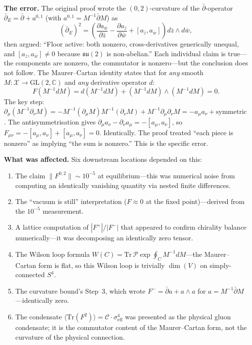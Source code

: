 \documentclass[11pt,a4paper]{article}
\theoremstyle{definition}
\theoremstyle{remark}
\newcommand{\C}{\mathbb{C}}
\newcommand{\dbar}{\bar{\partial}}
\newcommand{\Tr}{\mathrm{Tr}}
\newcommand{\GL}{\mathrm{GL}}
\newcommand{\su}{\mathfrak{su}}
\begin{document}
\textbf{The error.} The original proof wrote the $(0,2)$-curvature of the $\dbar$-operator $\dbar_E=\dbar+a^{0,1}$ (with $a^{0,1}=M^{-1}\dbar M$) as
\[
(\dbar_E)^2=\left(\frac{\partial a_{\bar{w}}}{\partial\bar{z}}-\frac{\partial a_{\bar{z}}}{\partial\bar{w}}+[a_{\bar{z}},a_{\bar{w}}]\right)d\bar{z}\wedge d\bar{w},
\]
then argued: ``Floor active: both nonzero, cross-derivatives generically unequal, and $[a_{\bar z},a_{\bar w}]\neq 0$ because $\su(2)$ is non-abelian.'' Each individual claim is true---the components are nonzero, the commutator is nonzero---but the conclusion does not follow. The Maurer--Cartan identity states that for \emph{any} smooth $M:\mathcal{X}\to\GL(2,\C)$ and \emph{any} derivative operator $d$:
\[
F(M^{-1}dM)=d(M^{-1}dM)+(M^{-1}dM)\wedge(M^{-1}dM)=0.
\]
The key step: $\partial_\mu(M^{-1}\partial_\nu M)=-M^{-1}(\partial_\mu M)M^{-1}(\partial_\nu M)+M^{-1}\partial_\mu\partial_\nu M=-a_\mu a_\nu+\text{symmetric}$. The antisymmetrisation gives $\partial_\mu a_\nu-\partial_\nu a_\mu=-[a_\mu,a_\nu]$, so $F_{\mu\nu}=-[a_\mu,a_\nu]+[a_\mu,a_\nu]=0$. Identically. The proof treated ``each piece is nonzero'' as implying ``the sum is nonzero.'' This is the specific error.

\textbf{What was affected.} Six downstream locations depended on this:
\begin{enumerate}[nosep]
\item The claim $\|F^{0,2}\|\sim 10^{-5}$ at equilibrium---this was numerical noise from computing an identically vanishing quantity via nested finite differences.
\item The ``vacuum is still'' interpretation ($F\approx 0$ at the fixed point)---derived from the $10^{-5}$ measurement.
\item A lattice computation of $|F^+|/|F^-|$ that appeared to confirm chirality balance numerically---it was decomposing an identically zero tensor.
\item The Wilson loop formula $W(C)=\Tr\,\mathcal{P}\exp\oint_C M^{-1}dM$---the Maurer--Cartan form is flat, so this Wilson loop is trivially $\dim(V)$ on simply-connected $S^4$.
\item The curvature bound's Step~3, which wrote $F^-=\dbar a+a\wedge a$ for $a=M^{-1}\dbar M$---identically zero.
\item The condensate $\langle\Tr(F^2)\rangle=\mathcal{C}\cdot\sigma_{\mathrm{eff}}^4$ was presented as the physical gluon condensate; it is the commutator content of the Maurer--Cartan form, not the curvature of the physical connection.
\end{enumerate}
\end{document}

